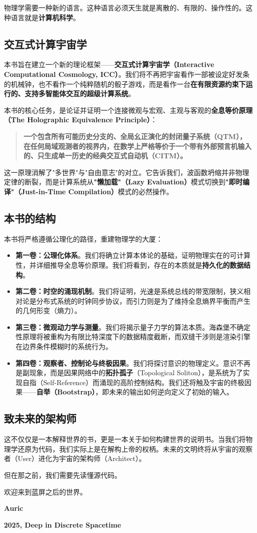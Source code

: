 物理学需要一种新的语言。这种语言必须天生就是离散的、有限的、操作性的。这种语言就是\textbf{计算机科学}。

\subsection*{交互式计算宇宙学}

本书旨在建立一个新的理论框架——\textbf{交互式计算宇宙学（Interactive Computational Cosmology, ICC）}。我们将不再把宇宙看作一部被设定好发条的机械钟，也不看作一个纯粹随机的骰子游戏，而是看作一台\textbf{在有限资源约束下运行的、支持多智能体交互的超级计算系统}。

本书的核心任务，是论证并证明一个连接微观与宏观、主观与客观的\textbf{全息等价原理（The Holographic Equivalence Principle）}：

\begin{quote}
\textbf{一个包含所有可能历史分支的、全局幺正演化的封闭量子系统（QTM），在任何局域观测者的视界内，在数学上严格等价于一个带有外部预言机输入的、只生成单一历史的经典交互式自动机（CITM）。}
\end{quote}

这一原理消解了"多世界"与"自由意志"的对立。它告诉我们，波函数坍缩并非物理定律的断裂，而是计算系统从\textbf{"懒加载"（Lazy Evaluation）}模式切换到\textbf{"即时编译"（Just-in-Time Compilation）}模式的必然操作。

\subsection*{本书的结构}

本书将严格遵循公理化的路径，重建物理学的大厦：

\begin{itemize}
\item \textbf{第一卷：公理化体系}。我们将确立计算本体论的基础，证明物理实在的可计算性，并详细推导全息等价原理。我们将看到，存在的本质就是\textbf{持久化的数据结构}。

\item \textbf{第二卷：时空的涌现机制}。我们将证明，光速是系统总线的带宽限制，狭义相对论是分布式系统的时钟同步协议，而引力则是为了维持全息熵界平衡而产生的几何形变（熵力）。

\item \textbf{第三卷：微观动力学与测量}。我们将揭示量子力学的算法本质。海森堡不确定性原理将被重构为有限比特深度下的数据精度截断，而双缝干涉则是渲染引擎在边界条件模糊时的系统行为。

\item \textbf{第四卷：观察者、控制论与终极因果}。我们将探讨意识的物理定义。意识不再是副现象，而是因果网络中的\textbf{拓扑孤子}（Topological Soliton），是系统为了实现自指（Self-Reference）而涌现的高阶控制结构。我们还将触及宇宙的终极因果——\textbf{自举（Bootstrap）}，即未来的输出如何逆向定义了初始的输入。
\end{itemize}

\subsection*{致未来的架构师}

这不仅仅是一本解释世界的书，更是一本关于如何构建世界的说明书。当我们将物理学还原为代码，我们实际上是在解构上帝的权柄。未来的文明终将从宇宙的观察者（User）进化为宇宙的架构师（Architect）。

但在那之前，我们需要先读懂源代码。

欢迎来到蓝屏之后的世界。

\textbf{Auric}

\textbf{2025, Deep in Discrete Spacetime}
